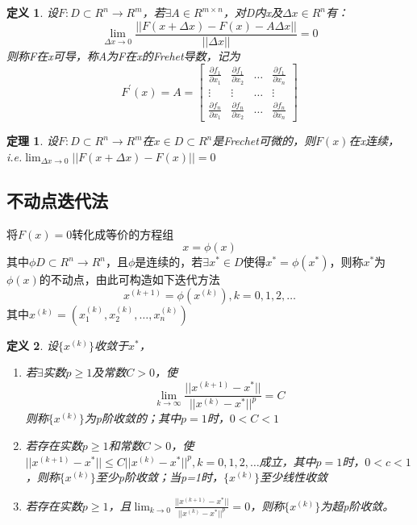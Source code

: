 \documentclass[a4paper]{article}
\newtheorem{definition}{定义}[section]
\newtheorem{theorem}{定理}[section]
\begin{document}
\begin{definition}
    设$F:D\subset R^n\rightarrow R^m$，若$\exists A\in R^{m\times n} $，对D内x及$\Delta x\in R^n$有：
    $$\lim_{\Delta x\rightarrow 0}\frac{||F(x+\Delta x)-F(x)-A\Delta x||}{||\Delta x||}=0$$
    则称F在x可导，称A为F在x的Frehet导数，记为
    $$F^{'}(x)=A=\left[
        \begin{matrix}
            \frac{\partial f_1}{\partial x_1} & \frac{\partial f_1}{\partial x_2} & \dots & \frac{\partial f_1}{\partial x_n} \\
            \vdots & \vdots & \dots & \vdots \\
            \frac{\partial f_n}{\partial x_1} & \frac{\partial f_n}{\partial x_2} & \dots & \frac{\partial f_n}{\partial x_n}
        \end{matrix}
        \right] $$
\end{definition}

\begin{theorem}
    设$F:D\subset R^n\rightarrow R^m$在$x\in D\subset R^n$是Frechet可微的，则$F(x)$在x连续，i.e.$\lim_{\Delta x\rightarrow 0}||F(x+\Delta x)-F(x)||=0$
\end{theorem}

\subsection{不动点迭代法}
将$F(x)=0$转化成等价的方程组
\begin{equation}
    x=\phi(x)
    \label{eq:5.3}
\end{equation}
其中$\phi D\subset R^n\rightarrow R^n$，且$\phi$是连续的，若$\exists x^*\in D$使得$x^*=\phi(x^*)$，则称$x^*$为$\phi(x)$的不动点，由此可构造如下迭代方法
\begin{equation}
    x^{(k+1)}=\phi(x^{(k)}), k=0,1,2,\dots
    \label{eq:5.4}
\end{equation}
其中$x^{(k)}=(x^{(k)}_1, x^{(k)}_2,\dots, x^{(k)}_n) $

\begin{definition}
    设$\{x^{(k)} \}$收敛于$x^*$，
    \begin{enumerate}
        \item 若$\exists$实数$p\ge 1$及常数$C>0$，使
        \begin{equation*}
            \lim_{k\rightarrow \infty}\frac{||x^{(k+1)}-x^*||}{||x^{(k)}-x^*||^p}=C
        \end{equation*}则称$\{x^{(k)} \}$为p阶收敛的；其中$p=1$时，$0<C<1$
        \item 若存在实数$p\ge 1$和常数$C>0$，使$||x^{(k+1)}-x^* ||\le C||x^{(k)}-x^* ||^p, k=0,1,2,\dots$成立，其中$p=1$时，$0<c<1$，则称$\{x^{(k)} \}$至少p阶收敛；当p=1时，$\{x^{(k)} \}$至少线性收敛
        \item 若存在实数$p\ge 1$，且$\lim_{k\rightarrow 0}\frac{||x^{(k+1)}-x^* ||}{||x^{(k)}-x^* ||^p}=0 $，则称$\{x^{(k)} \}$为超p阶收敛。
    \end{enumerate}
\end{definition}
\end{document}
